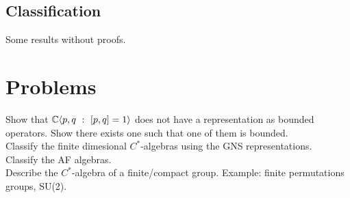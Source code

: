 \subsection{Classification}

Some results without proofs.

\section{Problems}

Show that $\mathbb C \langle p,q \ : \ [p,q] = 1\rangle $ does not have a representation as bounded operators. Show there exists one such that one of them is bounded.\\

Classify the finite dimesional $C^*$-algebras using the GNS representations.\\

Classify the AF algebras.\\

Describe the $C^*$-algebra of a finite/compact group. Example: finite permutations groups, SU(2).
